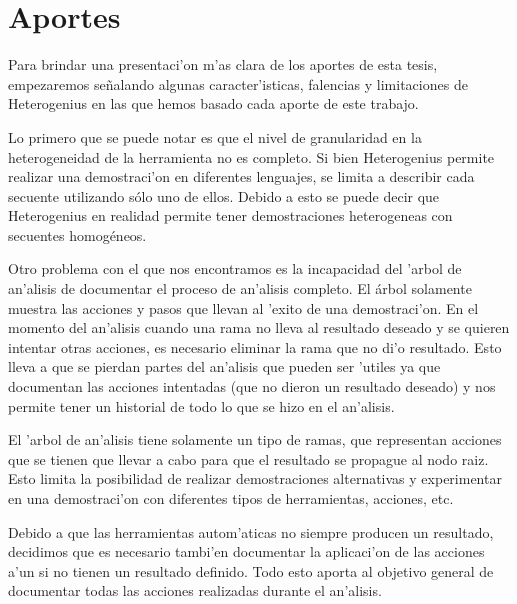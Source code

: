 \chapter{Aportes}

Para brindar una presentaci'on m'as clara de los aportes de esta tesis, empezaremos se\~nalando algunas caracter'isticas, falencias y limitaciones de Heterogenius en las que hemos basado cada aporte de este trabajo.

Lo primero que se puede notar es que el nivel de granularidad en la heterogeneidad de la herramienta no es completo. 
Si bien Heterogenius permite realizar una demostraci'on en diferentes lenguajes, se limita a describir cada secuente utilizando sólo uno de ellos. 
Debido a esto se puede decir que Heterogenius en realidad permite tener demostraciones heterogeneas con secuentes homogéneos. 

Otro problema con el que nos encontramos es la incapacidad del 'arbol de an'alisis de documentar el proceso de an'alisis completo. El árbol solamente muestra las acciones y pasos que llevan al 'exito de una demostraci'on. En el momento del an'alisis cuando una rama no lleva al resultado deseado y se quieren intentar otras acciones, es necesario eliminar la rama que no di'o resultado. Esto lleva a que se pierdan partes del an'alisis que pueden ser 'utiles ya que documentan las acciones intentadas (que no dieron un resultado deseado) y nos permite tener un historial de todo lo que se hizo en el an'alisis.

El 'arbol de an'alisis tiene solamente un tipo de ramas, que representan acciones que se tienen que llevar a cabo para que el resultado se propague al nodo raiz. Esto limita la posibilidad de realizar demostraciones alternativas y experimentar en una demostraci'on con diferentes tipos de herramientas, acciones, etc.

Debido a que las herramientas autom'aticas no siempre producen un resultado, decidimos que es necesario tambi'en documentar la aplicaci'on de las acciones a'un si no tienen un resultado definido. Todo esto aporta al objetivo general de documentar todas las acciones realizadas durante el an'alisis.











